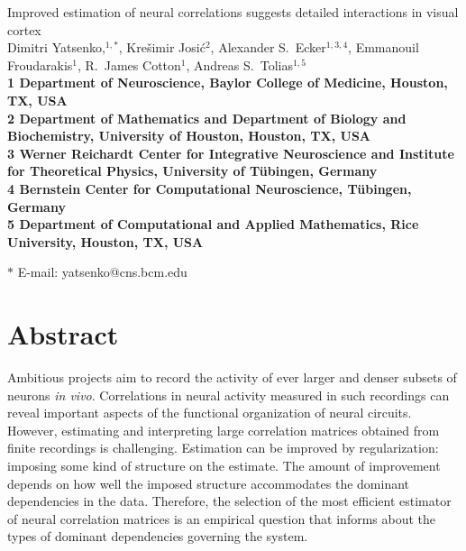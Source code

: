 \documentclass[10pt]{article}
\date{}
\begin{document}
\begin{flushleft}
{\Large
Improved estimation of neural correlations suggests detailed interactions in visual cortex
}
\\
Dimitri Yatsenko,$^{1,\ast}$, 
Kre\v{s}imir Josi\'{c}$^{2}$,
Alexander S.~Ecker$^{1,3,4}$,
Emmanouil Froudarakis$^{1}$,
R.~James Cotton$^{1}$,
Andreas S.~Tolias$^{1,5}$
\\
\bf{1} Department of Neuroscience, Baylor College of Medicine, Houston, TX, USA
\\
\bf{2} Department of Mathematics and Department of Biology and Biochemistry, University of Houston, Houston, TX, USA
\\
\bf{3}  Werner Reichardt Center for Integrative Neuroscience and Institute for Theoretical Physics, University of T\"ubingen, Germany
\\
\bf{4} Bernstein Center for Computational Neuroscience, T\"ubingen, Germany
\\
\bf{5} Department of Computational and Applied Mathematics, Rice University, Houston, TX, USA

$\ast$ E-mail: yatsenko@cns.bcm.edu
\end{flushleft}

\section*{Abstract}
Ambitious projects aim to record the activity of ever larger and denser subsets of neurons \emph{in vivo}.  Correlations in neural activity measured in such recordings can reveal important aspects of the functional organization of neural circuits.  However, estimating and interpreting large correlation matrices obtained from finite recordings is challenging.  Estimation can be improved by regularization: imposing some kind of structure on the estimate.  The amount of improvement depends on how well the imposed structure accommodates the dominant dependencies in the data.  Therefore, the selection of the most efficient estimator of neural correlation matrices is an empirical question that informs about the types of dominant dependencies governing the system.
\end{document}
